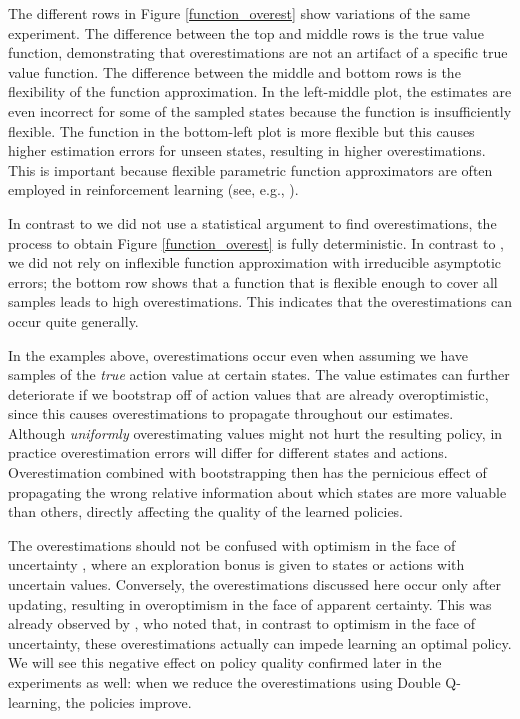 \documentclass[letterpaper]{article}
\begin{document}
The different rows in Figure \ref{function_overest} show variations of the same experiment.  The difference between the top and middle rows is the true value function, demonstrating that overestimations are not an artifact of a specific true value function.  The difference between the middle and bottom rows is the flexibility of the function approximation.  In the left-middle plot, the estimates are even incorrect for some of the sampled states because the function is insufficiently flexible.  The function in the bottom-left plot is more flexible but this causes higher estimation errors for unseen states, resulting in higher overestimations.  This is important because flexible parametric function approximators are often employed in reinforcement learning (see, e.g., \citealt{Tesauro:1995,Sallans:2004,Riedmiller:2005,Mnih:2015}). 

In contrast to \citet{vanHasselt:2010} we did not use a statistical argument to find overestimations, the process to obtain Figure \ref{function_overest} is fully deterministic. In contrast to \citet{Thrun:1993}, we did not rely on inflexible function approximation with irreducible asymptotic errors; the bottom row shows that a function that is flexible enough to cover all samples leads to high overestimations. This indicates that the overestimations can occur quite generally.

In the examples above, overestimations occur even when assuming we have samples of the \textit{true} action value at certain states.
The value estimates can further deteriorate if we bootstrap off of action values that are already overoptimistic, since this causes overestimations to propagate throughout our estimates.  
Although \textit{uniformly} overestimating values might not hurt the resulting policy, in practice overestimation errors will differ for different states and actions. Overestimation combined with bootstrapping then has the pernicious effect of propagating the wrong relative information about which states are more valuable than others, directly affecting the quality of the learned policies. 

The overestimations should not be confused with optimism in the face of uncertainty \citep{Sutton:1990,Agrawal:1995,Kaelbling:1996,Auer:2002,Brafman:2003,Szita:2008,Strehl:2009}, where an exploration bonus is given to states or actions with uncertain values.  Conversely, the overestimations discussed here occur only after updating, resulting in overoptimism in the face of apparent certainty.  This was already observed by \citet{Thrun:1993}, who noted that, in contrast to optimism in the face of uncertainty, these overestimations actually can impede learning an optimal policy.  We will see this negative effect on policy quality confirmed later in the experiments as well: when we reduce the overestimations using Double Q-learning, the policies improve.
\end{document}
